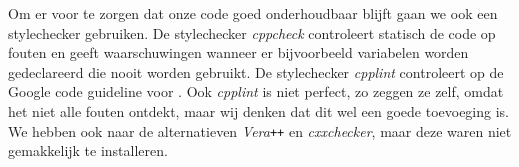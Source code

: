 Om er voor te zorgen dat onze code goed onderhoudbaar blijft gaan we ook een stylechecker gebruiken. De stylechecker \emph{cppcheck} controleert statisch de code op fouten en geeft waarschuwingen wanneer er bijvoorbeeld variabelen worden gedeclareerd die nooit worden gebruikt. De stylechecker \emph{cpplint} controleert op de Google code guideline voor \cpp. Ook \emph{cpplint} is niet perfect, zo zeggen ze zelf, omdat het niet alle fouten ontdekt, maar wij denken dat dit wel een goede toevoeging is. We hebben ook naar de alternatieven \emph{Vera\texttt{++}} en \emph{cxxchecker}, maar deze waren niet gemakkelijk te installeren.
